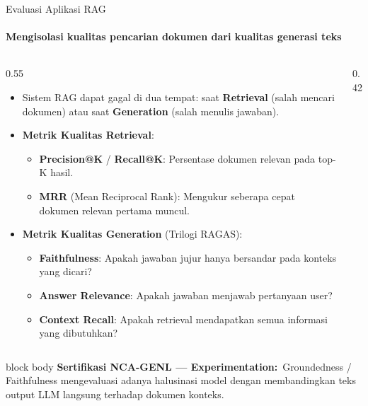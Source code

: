 \documentclass[aspectratio=169,t]{beamer}
\newcommand{\certnote}[2]{%
  \vspace{0.1em}
  \begin{beamercolorbox}[rounded=true,shadow=false,sep=4pt]{block body}
    {\scriptsize\color{nvblue}\textbf{Sertifikasi NCA-GENL --- #1:}}\,
    {\scriptsize\color{nvgray}#2}
  \end{beamercolorbox}%
}
\begin{document}
\begin{frame}{Evaluasi Aplikasi RAG}
  \framesubtitle{Mengisolasi kualitas pencarian dokumen dari kualitas generasi teks}
  \begin{columns}[T]
    \begin{column}{0.55\textwidth}
      \begin{itemize}\scriptsize
        \item Sistem RAG dapat gagal di dua tempat: saat \textbf{Retrieval} (salah mencari dokumen) atau saat \textbf{Generation} (salah menulis jawaban).
        \item \textbf{Metrik Kualitas Retrieval}:
          \begin{itemize}\scriptsize
            \item \textbf{Precision@K} / \textbf{Recall@K}: Persentase dokumen relevan pada top-K hasil.
            \item \textbf{MRR} (Mean Reciprocal Rank): Mengukur seberapa cepat dokumen relevan pertama muncul.
          \end{itemize}
        \item \textbf{Metrik Kualitas Generation} (Trilogi RAGAS):
          \begin{itemize}\scriptsize
            \item \textbf{Faithfulness}: Apakah jawaban jujur hanya bersandar pada konteks yang dicari?
            \item \textbf{Answer Relevance}: Apakah jawaban menjawab pertanyaan user?
            \item \textbf{Context Recall}: Apakah retrieval mendapatkan semua informasi yang dibutuhkan?
          \end{itemize}
      \end{itemize}
    \end{column}
    \begin{column}{0.42\textwidth}
      \begin{center}
      \end{center}
    \end{column}
  \end{columns}
  \certnote{Experimentation}{Groundedness / Faithfulness mengevaluasi adanya halusinasi model dengan membandingkan teks output LLM langsung terhadap dokumen konteks.}
\end{frame}
\end{document}

